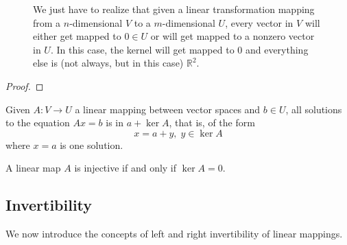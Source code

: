 \begin{theorem}
\begin{figure}[H]
      \caption{We just have to realize that given a linear transformation mapping from a $n$-dimensional $V$ to a $m$-dimensional $U$, every vector in $V$ will either get mapped to $0 \in U$ or will get mapped to a nonzero vector in $U$. In this case, the kernel will get mapped to $0$ and everything else is (not always, but in this case) $\mathbb{R}^2$. } 
      \label{fig:rank_nullity}
    \end{figure}
  \end{theorem}
  \begin{proof}
    
  \end{proof}

  \begin{theorem}
    Given $A: V \longrightarrow U$ a linear mapping between vector spaces and $b \in U$, all solutions to the equation $Ax = b$ is in $a + \ker A$, that is, of the form 
    \begin{equation}
      x = a + y, \; y \in \ker A
    \end{equation}
    where $x = a$ is one solution. 
  \end{theorem}

  \begin{corollary}
    A linear map $A$ is injective if and only if $\ker A = 0$.
  \end{corollary}

\subsection{Invertibility} 

  We now introduce the concepts of left and right invertibility of linear mappings. 

